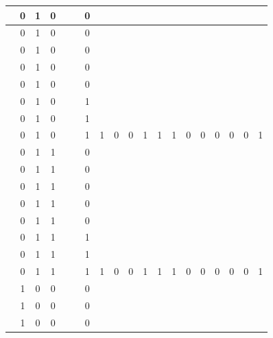 \begin{table}[!tb]
\begin{tabular}{|c|c|c|c|c|c|c|c|c|c|c|c|c|c|c|c|c|c|c|}
        \rowcolor{red!40}  & 0 & 1 & 0 &  &  & 0 &  &  &  &  &  &  &  &  &  &  &  &  \\ \hline
        \rowcolor{red!40}  & 0 & 1 & 0 &  &  & 0 &  &  &  &  &  &  &  &  &  &  &  &  \\ \hline
        \rowcolor{red!40}  & 0 & 1 & 0 &  &  & 0 &  &  &  &  &  &  &  &  &  &  &  &  \\ \hline
        \rowcolor{red!40}  & 0 & 1 & 0 &  &  & 0 &  &  &  &  &  &  &  &  &  &  &  &  \\ \hline
        \rowcolor{red!40}  & 0 & 1 & 0 &  &  & 0 &  &  &  &  &  &  &  &  &  &  &  &  \\ \hline
        \rowcolor{red!40}  & 0 & 1 & 0 &  &  & 1 &  &  &  &  &  &  &  &  &  &  &  &  \\ \hline
        \rowcolor{red!40}  & 0 & 1 & 0 &  &  & 1 &  &  &  &  &  &  &  &  &  &  &  &  \\ \hline
        \rowcolor{red!40}  & 0 & 1 & 0 &  &  & 1 & 1 & 0 & 0 & 1 & 1 & 1 & 0 & 0 & 0 & 0 & 0 & 1 \\ \hline
        \rowcolor{green!40}  & 0 & 1 & 1 &  &  & 0 &  &  &  &  &  &  &  &  &  &  &  &  \\ \hline
        \rowcolor{green!40}  & 0 & 1 & 1 &  &  & 0 &  &  &  &  &  &  &  &  &  &  &  &  \\ \hline
        \rowcolor{green!40}  & 0 & 1 & 1 &  &  & 0 &  &  &  &  &  &  &  &  &  &  &  &  \\ \hline
        \rowcolor{green!40}  & 0 & 1 & 1 &  &  & 0 &  &  &  &  &  &  &  &  &  &  &  &  \\ \hline
        \rowcolor{green!40}  & 0 & 1 & 1 &  &  & 0 &  &  &  &  &  &  &  &  &  &  &  &  \\ \hline
        \rowcolor{green!40}  & 0 & 1 & 1 &  &  & 1 &  &  &  &  &  &  &  &  &  &  &  &  \\ \hline
        \rowcolor{green!40}  & 0 & 1 & 1 &  &  & 1 &  &  &  &  &  &  &  &  &  &  &  &  \\ \hline
        \rowcolor{green!40}  & 0 & 1 & 1 &  &  & 1 & 1 & 0 & 0 & 1 & 1 & 1 & 0 & 0 & 0 & 0 & 0 & 1 \\ \hline
        \rowcolor{yellow!40}  & 1 & 0 & 0 &  &  & 0 &  &  &  &  &  &  &  &  &  &  &  &  \\ \hline
        \rowcolor{yellow!40}  & 1 & 0 & 0 &  &  & 0 &  &  &  &  &  &  &  &  &  &  &  &  \\ \hline
        \rowcolor{yellow!40}  & 1 & 0 & 0 &  &  & 0 &  &  &  &  &  &  &  &  &  &  &  &  \\ \hline

\end{tabular}
\end{table}
